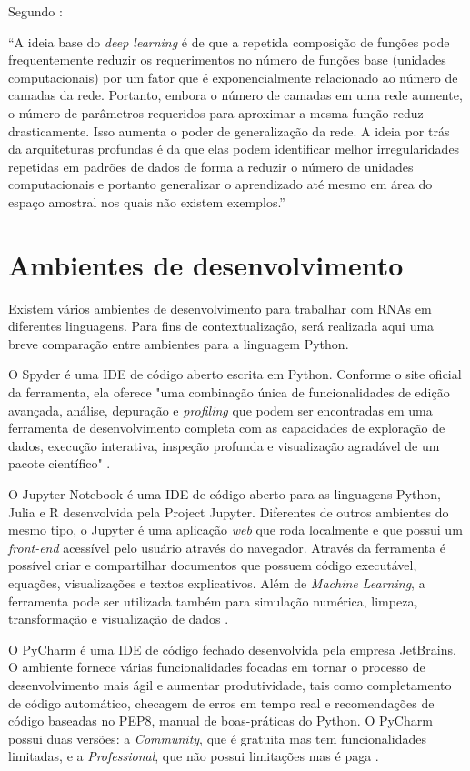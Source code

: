 Segundo :

\begin{citacao}
“A ideia base do \textit{deep learning} é de que a repetida composição de funções pode frequentemente reduzir os requerimentos no número de funções base (unidades computacionais) por um fator que é exponencialmente relacionado ao número de camadas da rede. Portanto, embora o número de camadas em uma rede aumente, o número de parâmetros requeridos para aproximar a mesma função reduz drasticamente. Isso aumenta o poder de generalização da rede. A ideia por trás da arquiteturas profundas é da que elas podem identificar melhor irregularidades repetidas em padrões de dados de forma a reduzir o número de unidades computacionais e portanto generalizar o aprendizado até mesmo em área do espaço amostral nos quais não existem exemplos.”
\end{citacao}

\section{Ambientes de desenvolvimento} \label{ambientes}
Existem vários ambientes de desenvolvimento para trabalhar com RNAs em diferentes linguagens. Para fins de contextualização, será realizada aqui uma breve comparação entre ambientes para a linguagem Python.

O Spyder é uma IDE de código aberto escrita em Python. Conforme o site oficial da ferramenta, ela oferece "uma combinação única de funcionalidades de edição avançada, análise, depuração e \textit{profiling} que podem ser encontradas em uma ferramenta de desenvolvimento completa com as capacidades de exploração de dados, execução interativa, inspeção profunda e visualização agradável de um pacote científico" \cite{spyder20}.

O Jupyter Notebook é uma IDE de código aberto para as linguagens Python, Julia e R desenvolvida pela Project Jupyter. Diferentes de outros ambientes do mesmo tipo, o Jupyter é uma aplicação \textit{web} que roda localmente e que possui um \textit{front-end} acessível pelo usuário através do navegador. Através da ferramenta é possível criar e compartilhar documentos que possuem código executável, equações, visualizações e textos explicativos. Além de \textit{Machine Learning}, a ferramenta pode ser utilizada também para simulação numérica, limpeza, transformação e visualização de dados \cite{jupyter20}.

O PyCharm é uma IDE de código fechado desenvolvida pela empresa JetBrains. O ambiente fornece várias funcionalidades focadas em tornar o processo de desenvolvimento mais ágil e aumentar produtividade, tais como completamento de código automático, checagem de erros em tempo real e recomendações de código baseadas no PEP8, manual de boas-práticas do Python. O PyCharm possui duas versões: a \textit{Community}, que é gratuita mas tem funcionalidades limitadas, e a \textit{Professional}, que não possui limitações mas é paga \cite{pycharm20}. 


